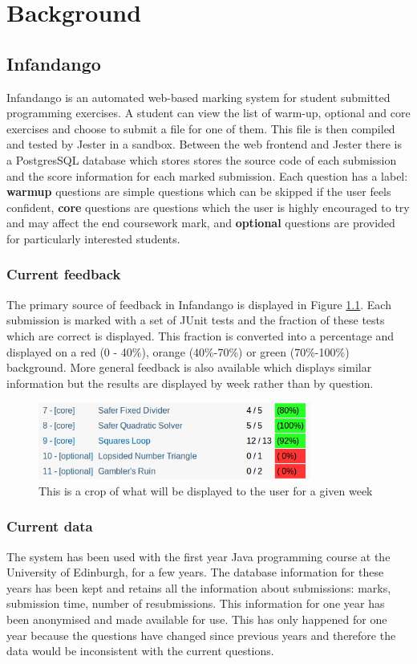 \chapter{Background}
\label{background}
\section{Infandango}
Infandango is an automated web-based marking system for student submitted programming exercises. A student can view the list of warm-up, optional and core exercises and choose to submit a file for one of them. This file is then compiled and tested by Jester in a sandbox. Between the web frontend and Jester there is a PostgresSQL database which stores stores the source code of each submission and the score information for each marked submission.
Each question has a label: {\bf warmup} questions are simple questions which can be skipped if the user feels confident, {\bf core} questions are questions which the user is highly encouraged to try and may affect the end coursework mark, and {\bf optional} questions are provided for particularly interested students.
\subsection{Current feedback}
The primary source of feedback in Infandango is displayed in Figure \ref{fig:currentfeedback}. Each submission is marked with a set of JUnit tests and the fraction of these tests which are correct is displayed. This fraction is converted into a percentage and displayed on a red (0 - 40\%), orange (40\%-70\%) or green (70\%-100\%) background.
More general feedback is also available which displays similar information but the results are displayed by week rather than by question. 

\begin{figure}[p]
\centering
\includegraphics[width=0.8\textwidth]{currentfeedback.png}
\caption{This is a crop of what will be displayed to the user for a given week}
\label{fig:currentfeedback}
\end{figure}

\subsection{Current data}
The system has been used with the first year Java programming course at the University of Edinburgh, for a few years. The database information for these years has been kept and retains all the information about submissions: marks, submission time, number of resubmissions. This information for one year has been anonymised and made available for use. This has only happened for one year because the questions have changed since previous years and therefore the data would be inconsistent with the current questions.

